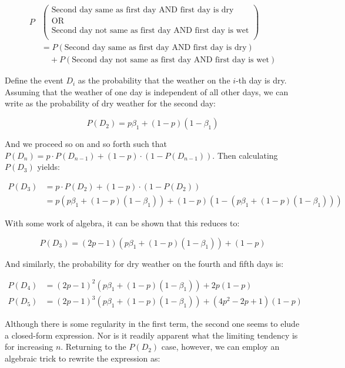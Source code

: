 \documentclass[10pt, oneside]{article}   	%
\theoremstyle{definition}
\begin{document}
\begin{enumerate}[label=3.\arabic*]
   \begin{align*}
   P &\begin{pmatrix} %
      \text{Second day same as first day AND first day is dry}  \\
      \text{OR}  \\
      \text{Second day not same as first day AND first day is wet} \\
   \end{pmatrix} \\
   &= P(\text{Second day same as first day AND first day is dry}) \\
   &\quad + P( \text{Second day not same as first day AND first day is wet})
   \end{align*}
   
   Define the event $D_i$ as the probability that the weather on the $i$-th day is dry. Assuming that the weather of one day is independent of all other days, we can write as the probability of dry weather for the second day:
   
   \[ P(D_2) = p \beta_1 + (1-p)(1 - \beta_1) \]
   
   And we proceed so on and so forth such that $P(D_{n}) = p \cdot P(D_{n-1}) + (1-p) \cdot (1 - P(D_{n-1}))$. Then calculating $P(D_3)$ yields:
   
   \begin{align*}
   P(D_{3}) &= p \cdot P(D_{2}) + (1-p) \cdot (1 - P(D_{2})) \\
   &= p(p \beta_1 + (1-p)(1 - \beta_1)) + (1-p) (1 - (p \beta_1 + (1-p)(1 - \beta_1)))
   \end{align*}
   
   With some work of algebra, it can be shown that this reduces to:
   
   \[ P(D_3) = (2p-1)(p \beta_1 + (1-p)(1 - \beta_1)) + (1-p) \]
   
   And similarly, the probability for dry weather on the fourth and fifth days is:
   
   \begin{align*}
   P(D_4) &= (2p-1)^2 (p \beta_1 + (1-p)(1 - \beta_1)) + 2p(1-p) \\
   P(D_5) &= (2p-1)^3 (p \beta_1 + (1-p)(1 - \beta_1)) + (4p^2 - 2p + 1)(1-p)
   \end{align*}
   
   Although there is some regularity in the first term, the second one seems to elude a closed-form expression. Nor is it readily apparent what the limiting tendency is for increasing $n$. Returning to the $P(D_2)$ case, however, we can employ an algebraic trick to rewrite the expression as:
   

\end{enumerate}
\end{document}
